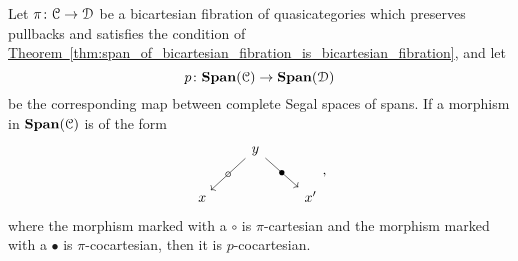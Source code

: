 \documentclass[main.tex]{subfiles}
\begin{document}
\begin{proposition}
  \label{prop:form_of_cocartesian_morphisms_in_spans}
  Let $\pi\colon \mathcal{C} \to \mathcal{D}$ be a bicartesian fibration of quasicategories which preserves pullbacks and satisfies the condition of \hyperref[thm:span_of_bicartesian_fibration_is_bicartesian_fibration]{Theorem~\ref*{thm:span_of_bicartesian_fibration_is_bicartesian_fibration}}, and let
  \begin{equation*}
    p\colon \mathbf{Span}(\mathcal{C}) \to \mathbf{Span}(\mathcal{D})
  \end{equation*}
  be the corresponding map between complete Segal spaces of spans. If a morphism in $\mathbf{Span}(\mathcal{C})$ is of the form
  \begin{equation*}
    \begin{tikzcd}
      & y
      \arrow[dl, "\circ" marking]
      \arrow[dr, "\bullet" marking]
      \\
      x
      && x'
    \end{tikzcd},
  \end{equation*}
  where the morphism marked with a $\circ$ is $\pi$-cartesian and the morphism marked with a $\bullet$ is $\pi$-cocartesian, then it is $p$-cocartesian.
\end{proposition}
\end{document}
